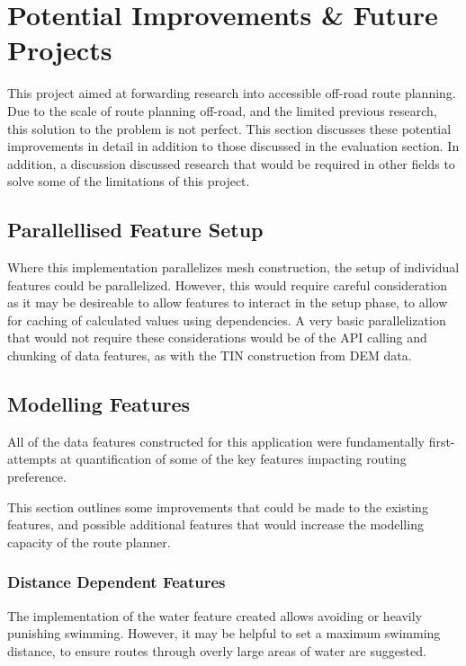 \documentclass[12pt]{article}
\begin{document}
\section{Potential Improvements \& Future Projects}

This project aimed at forwarding research into accessible off-road route planning. Due to the scale of route planning off-road, and the limited previous research, this solution to the problem is not perfect. This section discusses these potential improvements in detail in addition to those discussed in the evaluation section. In addition, a discussion discussed research that would be required in other fields to solve some of the limitations of this project.

\subsection{Parallellised Feature Setup}

Where this implementation parallelizes mesh construction, the setup of individual features could be parallelized. However, this would require careful consideration as it may be desireable to allow features to interact in the setup phase, to allow for caching of calculated values using dependencies. A very basic parallelization that would not require these considerations would be of the API calling and chunking of data features, as with the TIN construction from DEM data.

\subsection{Modelling Features}

All of the data features constructed for this application were fundamentally first-attempts at quantification of some of the key features impacting routing preference.

This section outlines some improvements that could be made to the existing features, and possible additional features that would increase the modelling capacity of the route planner.

\subsubsection{Distance Dependent Features}

The implementation of the water feature created allows avoiding or heavily punishing swimming. However, it may be helpful to set a maximum swimming distance, to ensure routes through overly large areas of water are suggested.
\end{document}
